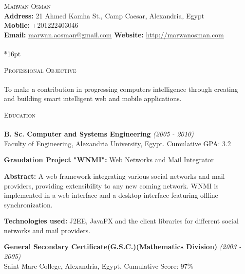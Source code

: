 \documentclass[letterpaper,12pt]{article}
\author{Marwan Osman}
\newcommand{\lineunder}{\vspace*{-8pt} \\ \hspace*{-8pt} \hrulefill \\}
\newcommand{\interval}[1] { \textit{(#1)} }
\newcommand{\header}[1]{{\hspace*{0pt}\vspace*{6pt} \textsc{#1}} \vspace*{-6pt} \lineunder}
\newcommand{\education}[3]{{\textbf{#1} \interval{#2}\\{#3}\\ }}
\newcommand{\objective}[1]{{#1\\\vspace*{8pt}}}
\newcommand{\contact}[3]{
\vspace*{-8pt}
{\LARGE \scshape {#1}}\\
#2 \lineunder 
#3
\vspace*{-8pt}
}
\newenvironment{details}{\vspace*{-4pt} \begin{list}{\topsep 0pt \itemsep -2pt}}{\vspace*{4pt}\end{list}}
\begin{document}
\small
\smallskip
\vspace*{-30pt}

\contact{Marwan Osman}
{\textbf{Address:} 21 Ahmed Kamha St., Camp Caesar, Alexandria, Egypt
\\\textbf{Mobile:} +201222403046
\\\textbf{Email:} \href{mailto:marwan.aosman@gmail.com}{marwan.aosman@gmail.com} \textbf{Website:} \url{http://marwanosman.com}
}

\vspace*{16pt}

\header{Professional Objective}
\objective{ To make a contribution in progressing computers intelligence through creating and building smart intelligent web and mobile applications.}

\header{Education}
\education{B. Sc. Computer and Systems Engineering}{2005 - 2010}{Faculty of Engineering, Alexandria University, Egypt. Cumulative GPA: 3.2}
  \begin{details}
    \item \textbf{ Graudation Project "WNMI":} Web Networks and Mail Integrator
    \item \textbf{ Abstract:} A web framework integrating various social networks and mail providers, providing extensibility to any new coming network. WNMI is implemented in a web interface and a desktop interface featuring offline synchronization.
    \item \textbf{ Technologies used:} J2EE, JavaFX and the client libraries for different social networks and mail providers.
  \end{details}
\vspace*{4pt}
\education{General Secondary Certificate(G.S.C.)(Mathematics Division)}{2003 - 2005}{Saint Marc College, Alexandria, Egypt. Cumulative Score: 97\%}
\vspace*{4pt}
\end{document}
